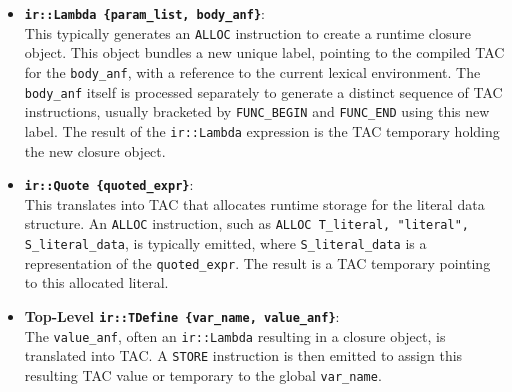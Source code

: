 \documentclass[final]{cmpreport_02}
\newcommand{\irnode}[1]{\texttt{ir::#1}}
\begin{document}
\begin{itemize}[itemsep=3pt]
    \item \textbf{\irnode{Lambda \{param\_list, body\_anf\}}}: \\
        This typically generates an \texttt{ALLOC} instruction to create a runtime closure object. This object bundles a new unique label, pointing to the compiled TAC for the \texttt{body\_anf}, with a reference to the current lexical environment. The \texttt{body\_anf} itself is processed separately to generate a distinct sequence of TAC instructions, usually bracketed by \texttt{FUNC\_BEGIN} and \texttt{FUNC\_END} using this new label. The result of the \irnode{Lambda} expression is the TAC temporary holding the new closure object.
    \item \textbf{\irnode{Quote \{quoted\_expr\}}}: \\
        This translates into TAC that allocates runtime storage for the literal data structure. An \texttt{ALLOC} instruction, such as \texttt{ALLOC T\_literal, "literal", S\_literal\_data}, is typically emitted, where \texttt{S\_literal\_data} is a representation of the \texttt{quoted\_expr}. The result is a TAC temporary pointing to this allocated literal.
    \item \textbf{Top-Level \irnode{TDefine \{var\_name, value\_anf\}}}: \\
        The \texttt{value\_anf}, often an \irnode{Lambda} resulting in a closure object, is translated into TAC. A \texttt{STORE} instruction is then emitted to assign this resulting TAC value or temporary to the global \texttt{var\_name}.
\end{itemize}
\label{app:qbe-table}
\end{document}
